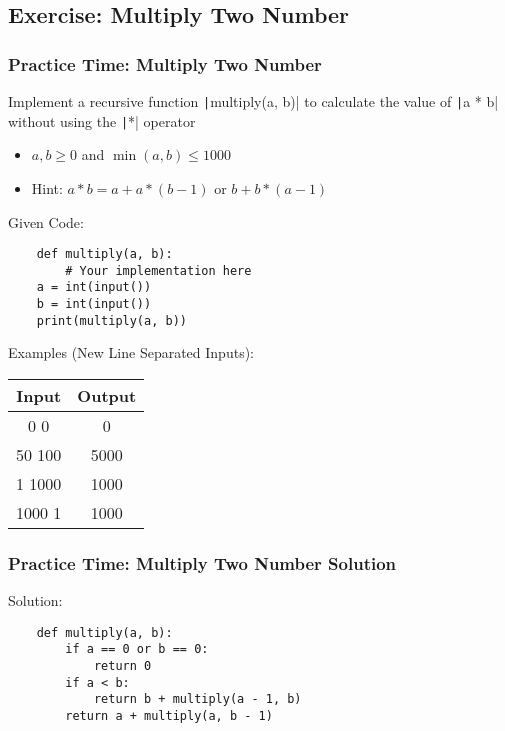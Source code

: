 \documentclass{beamer}
\newcommand{\python}[1]{\texttt|#1|}
\begin{document}
\subsection{Exercise: Multiply Two Number}
\begin{frame}[fragile]
    \frametitle{Practice Time: Multiply Two Number}

    Implement a recursive function \python{multiply(a, b)} to
    calculate the value of \python{a * b} without using the \python{*} operator
    \begin{itemize}
        \item $a, b \ge 0$ and $\min(a, b) \le 1000$
        \item Hint: $a * b = a + a * (b - 1)$ or $b + b * (a - 1)$
    \end{itemize}
    Given Code:
    \begin{verbatim}
    def multiply(a, b):
        # Your implementation here
    a = int(input())
    b = int(input())
    print(multiply(a, b))
    \end{verbatim}

    Examples (New Line Separated Inputs):
    \begin{center}
        \small
        \begin{tabular}{|c|c|}
            \hline
            Input  & Output \\ \hline
            0 0    & 0      \\ \hline
            50 100 & 5000   \\ \hline
            1 1000 & 1000   \\ \hline
            1000 1 & 1000   \\ \hline
        \end{tabular}
    \end{center}
\end{frame}
\begin{frame}[fragile]
    \frametitle{Practice Time: Multiply Two Number Solution}

    Solution:
    \begin{verbatim}
    def multiply(a, b):
        if a == 0 or b == 0:
            return 0
        if a < b:
            return b + multiply(a - 1, b)
        return a + multiply(a, b - 1)
    \end{verbatim}
\end{frame}
\end{document}
